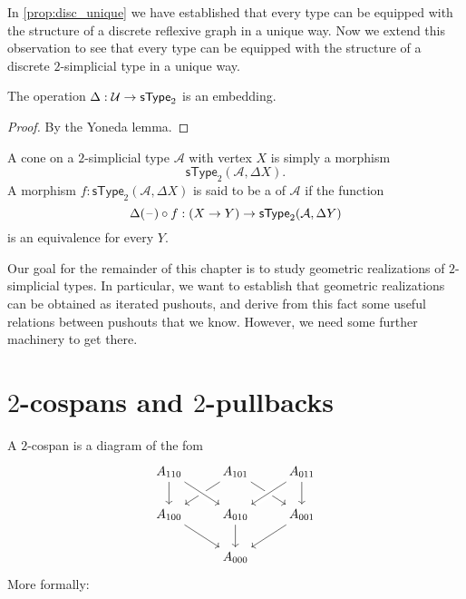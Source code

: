 In \cref{prop:disc_unique} we have established that every type can be equipped with the structure of a discrete reflexive graph in a unique way. Now we extend this observation to see that every type can be equipped with the structure of a discrete $2$-simplicial type in a unique way.

\begin{prp}\label{prp:2disc_emb}
The operation $\Delta:\mathcal{U}\to \mathsf{sType}_2$ is an embedding.
\end{prp}

\begin{proof}
By the Yoneda lemma.
\end{proof}

\begin{defn}
A cone on a $2$-simplicial type $\mathcal{A}$ with vertex $X$ is simply a morphism
\begin{equation*}
\mathsf{sType}_2(\mathcal{A},\Delta X).
\end{equation*}
A morphism $f:\mathsf{sType}_2(\mathcal{A},\Delta X)$ is said to be a  of $\mathcal{A}$ if the function
\begin{equation*}
\Delta(\mathord{\hspace{1pt}\text{--}\hspace{1pt}})\circ f : (X\to Y) \to \mathsf{sType}_2(\mathcal{A},\Delta Y)
\end{equation*}
is an equivalence for every $Y$. 
\end{defn}

Our goal for the remainder of this chapter is to study geometric realizations of $2$-simplicial types. In particular, we want to establish that geometric realizations can be obtained as iterated pushouts, and derive from this fact some useful relations between pushouts that we know. However, we need some further machinery to get there.

\section{$2$-cospans and $2$-pullbacks}

A $2$-cospan is a diagram of the fom
\begin{equation*}
\begin{tikzcd}
A_{110} \arrow[d] & A_{101} \arrow[dl] \arrow[dr] & A_{011} \arrow[d] \\
A_{100} \arrow[dr] & A_{010} \arrow[d] \arrow[from=ul,crossing over] \arrow[from=ur,crossing over] & A_{001} \arrow[dl] \\
& A_{000}
\end{tikzcd}
\end{equation*}
More formally:

